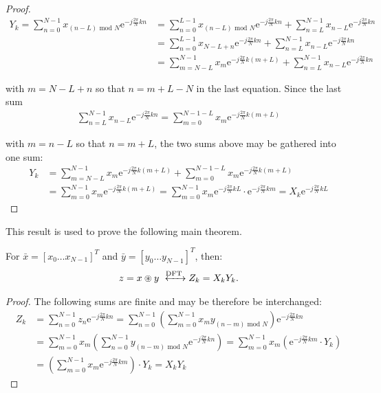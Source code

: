 \begin{proof}
\begin{align*}
Y_k = \sum_{n=0}^{N-1} x_{(n-L) \text{ mod } N} \text{e}^{-j\frac{2\pi}{N} kn} &= \sum_{n=0}^{L-1} x_{(n-L) \text{ mod } N}\text{e}^{-j\frac{2\pi}{N} kn} + \sum_{n=L}^{N-1} x_{n-L}\text{e}^{-j\frac{2\pi}{N} kn} \\
&= \sum_{n=0}^{L-1} x_{N-L+n}\text{e}^{-j\frac{2\pi}{N} kn} + \sum_{n=L}^{N-1} x_{n-L}\text{e}^{-j\frac{2\pi}{N} kn} \\
&= \sum_{m=N-L}^{N-1} x_{m}\text{e}^{-j\frac{2\pi}{N} k(m+L)} + \sum_{n=L}^{N-1} x_{n-L}\text{e}^{-j\frac{2\pi}{N} kn}
\end{align*}

with $m = N - L + n$ so that $n = m + L - N$ in the last equation. Since the last sum
\begin{align*}
\sum_{n=L}^{N-1} x_{n-L}\text{e}^{-j\frac{2\pi}{N} kn} = \sum_{m=0}^{N-1-L} x_m \text{e}^{-j\frac{2\pi}{N}k(m+L)}
\end{align*}

with $m = n - L$ so that $n = m + L$, the two sums above may be gathered into one sum:
\begin{align*}
Y_k &= \sum_{m=N-L}^{N-1} x_{m}\text{e}^{-j\frac{2\pi}{N} k(m+L)} + \sum_{m=0}^{N-1-L} x_m \text{e}^{-j\frac{2\pi}{N}k(m+L)}  \\
&= \sum_{m=0}^{N-1} x_m \text{e}^{-j\frac{2\pi}{N}k(m+L)} = \sum_{m=0}^{N-1} x_m \text{e}^{-j\frac{2\pi}{N}kL} \cdot \text{e}^{-j\frac{2\pi}{N}km} = X_k \text{e}^{-j\frac{2\pi}{N}kL}
\end{align*}
\end{proof}

This result is used to prove the following main theorem.

\begin{theorem}
For $\bar{x} = [x_0 \dots x_{N-1}]^T$ and $\bar{y} = [y_0 \dots y_{N-1}]^T$, then:
\begin{align*}
z = x \circledast y \xleftrightarrow{\text{DFT}} Z_k = X_k Y_k.
\end{align*}
\end{theorem}

\begin{proof}
The following sums are finite and may be therefore be interchanged:
\begin{align*}
Z_k &= \sum_{n=0}^{N-1} z_n \text{e}^{-j\frac{2\pi}{N}kn} = \sum_{n=0}^{N-1} \left( \sum_{m=0}^{N-1} x_m y_{(n-m) \text{ mod } N} \right) \text{e}^{-j\frac{2\pi}{N}kn} \\
&= \sum_{m=0}^{N-1} x_m \left( \sum_{n=0}^{N-1} y_{(n-m) \text{ mod } N} \text{e}^{-j\frac{2\pi}{N}kn} \right) = \sum_{m=0}^{N-1} x_m \left( \text{e}^{-j\frac{2\pi}{N}km} \cdot Y_k \right) \\
&= \left( \sum_{m=0}^{N-1} x_m \text{e}^{-j\frac{2\pi}{N}km} \right) \cdot Y_k = X_k Y_k
\end{align*}
\end{proof}

